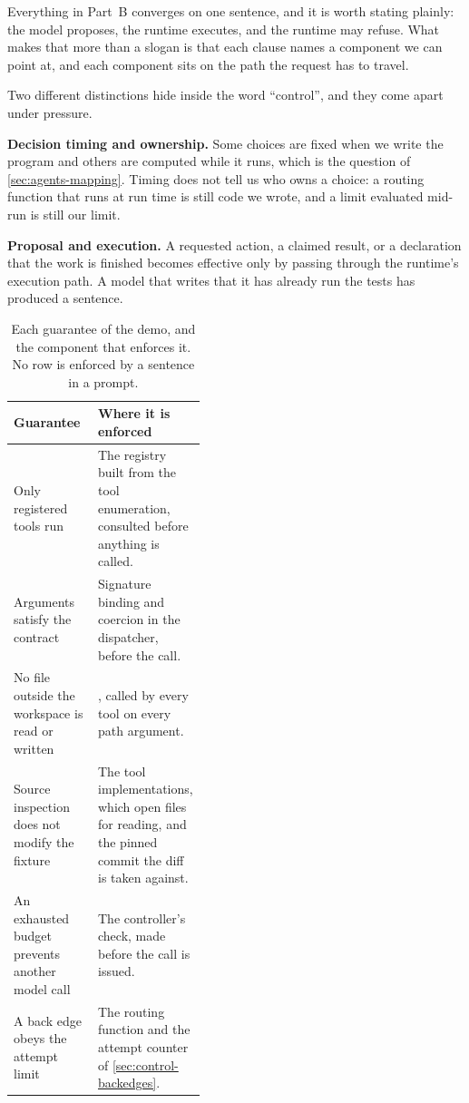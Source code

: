 Everything in Part~B converges on one sentence, and it is worth stating plainly: the model proposes,
the runtime executes, and the runtime may refuse. What makes that more than a slogan is that each
clause names a component we can point at, and each component sits on the path the request has to
travel.

Two different distinctions hide inside the word ``control'', and they come apart under pressure.

\bi

\item \textbf{Decision timing and ownership.} Some choices are fixed when we write the program and
others are computed while it runs, which is the question of \cref{sec:agents-mapping}. Timing does
not tell us who owns a choice: a routing function that runs at run time is still code we wrote, and
a limit evaluated mid-run is still our limit.

\item \textbf{Proposal and execution.} A requested action, a claimed result, or a declaration that
the work is finished becomes effective only by passing through the runtime's execution path. A
model that writes that it has already run the tests has produced a sentence.

\ei

\begin{table}[htbp]
  \centering
  \begin{adjustbox}{width=\linewidth}\begin{tabularx}{\linewidth}{@{}XL{0.42\linewidth}@{}}
    \toprule
    \textbf{Guarantee} & \textbf{Where it is enforced} \\
    \midrule
    Only registered tools run & The registry built from the tool enumeration, consulted before
      anything is called. \\
    Arguments satisfy the contract & Signature binding and coercion in the dispatcher, before the
      call. \\
    No file outside the workspace is read or written & , called by every
      tool on every path argument. \\
    Source inspection does not modify the fixture & The tool implementations, which open files for
      reading, and the pinned commit the diff is taken against. \\
    An exhausted budget prevents another model call & The controller's check, made before the call
      is issued. \\
    A back edge obeys the attempt limit & The routing function and the attempt counter of
      \cref{sec:control-backedges}. \\
    \bottomrule
  \end{tabularx}\end{adjustbox}
  \caption{Each guarantee of the demo, and the component that enforces it. No row is enforced by a
  sentence in a prompt.}
  \label{tab:boundary-authority}
\end{table}

